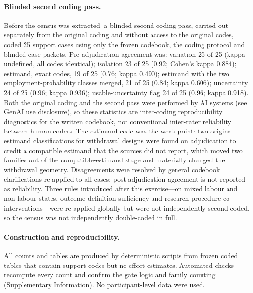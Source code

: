 \documentclass[11pt]{article}
\begin{document}
\paragraph{Blinded second coding pass.} Before the census was extracted, a blinded second coding pass, carried out separately from the original coding and without access to the original codes, coded 25 support cases using only the frozen codebook, the coding protocol and blinded case packets. Pre-adjudication agreement was: variation 25 of 25 (kappa undefined, all codes identical); isolation 23 of 25 (0.92; Cohen's kappa 0.884); estimand, exact codes, 19 of 25 (0.76; kappa 0.490); estimand with the two employment-probability classes merged, 21 of 25 (0.84; kappa 0.606); uncertainty 24 of 25 (0.96; kappa 0.936); usable-uncertainty flag 24 of 25 (0.96; kappa 0.918). %
Both the original coding and the second pass were performed by AI systems (see GenAI use disclosure), so these statistics are inter-coding reproducibility diagnostics for the written codebook, not conventional inter-rater reliability between human coders. The estimand code was the weak point: two original estimand classifications for withdrawal designs were found on adjudication to credit a compatible estimand that the sources did not report, which moved two families out of the compatible-estimand stage and materially changed the withdrawal geometry. Disagreements were resolved by general codebook clarifications re-applied to all cases; post-adjudication agreement is not reported as reliability. Three rules introduced after this exercise---on mixed labour and non-labour states, outcome-definition sufficiency and research-procedure co-interventions---were re-applied globally but were not independently second-coded, so the census was not independently double-coded in full.

\paragraph{Construction and reproducibility.} All counts and tables are produced by deterministic scripts from frozen coded tables that contain support codes but no effect estimates. Automated checks recompute every count and confirm the gate logic and family counting (Supplementary Information). No participant-level data were used.
\end{document}
